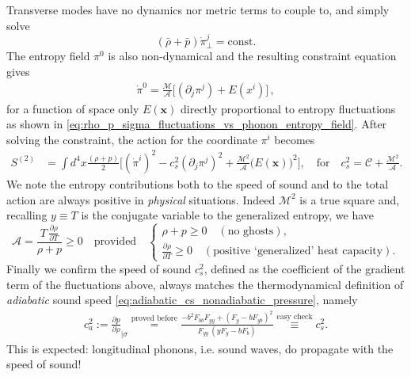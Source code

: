 Transverse modes have no dynamics nor metric terms to couple to, and simply solve
\begin{equation}
    (\bar{\rho}+\bar{p})\dot{\pi}_\perp^j=\text{const}.
\end{equation}
The entropy field $\pi^0$ is also non-dynamical and the resulting constraint equation gives
\begin{align}\label{eq:integrate_out_entropy_flat_spacetime}
    \dot{\pi}^0 = \frac{\mathcal{M}}{\mathcal{A}} \Big[(\partial_j \pi^j) +  {E(x^i)}\Big]\,,
\end{align}
for a function of space only $E(\mathbf{x})$ directly proportional to entropy fluctuations as shown in \eqref{eq:rho_p_sigma_fluctuations_vs_phonon_entropy_field}.
After solving the constraint, the action for the coordinate $\pi^i$ becomes
{\small
\begin{align}
    S^{(2)}&= \int d^4x \frac{(\rho+p)}{2}\Big[(\dot{\pi}^i)^2 - c_s^2 (\partial_j\pi^j)^2 +\tfrac{\mathcal{M}^2}{\mathcal{A}}\big(E(\mathbf{x})\big)^2\Big], \quad \text{for}\quad c_s^2 = \mathcal{C} + \frac{\mathcal{M}^2}{\mathcal{A}}.
\end{align}
}
We note the entropy contributions both to the speed of sound and to the total action are always positive in \emph{physical} situations.
Indeed $\mathcal{M}^2$ is a true square and, recalling $y\equiv T$ is the conjugate variable to the generalized entropy, we have
\begin{equation}
    \mathcal{A}= \frac{T\, \frac{\partial\rho }{\partial T}}{\rho+p}\geq 0 \quad\text{provided}\quad
    \begin{cases}
        \rho+p\geq 0 \quad(\text{no ghosts}),\\
        \frac{\partial\rho }{\partial T} \geq 0 \quad(\text{positive `generalized' heat capacity}).
    \end{cases} 
\end{equation}
Finally we confirm the speed of sound $c_s^2$, defined as the coefficient of the gradient term of the fluctuations above, always matches the thermodynamical definition of \emph{adiabatic} sound speed \eqref{eq:adiabatic_cs_nonadiabatic_pressure}, namely
\begin{align}\label{eq:cs_equiv_ca_flat_spacetime}
    c_a^2:= \frac{\partial p}{\partial \rho}_{\mid \sigma} \overset{\text{proved before}}{=}\frac{-b^2F_{bb} F_{yy}+(F_y-bF_{yb})^2}{F_{yy}\,(yF_y-bF_b)} \overset{\text{easy check}}{\equiv} c_s^2.
\end{align}
This is expected: longitudinal phonons, i.e. sound waves, do propagate with the speed of sound!




